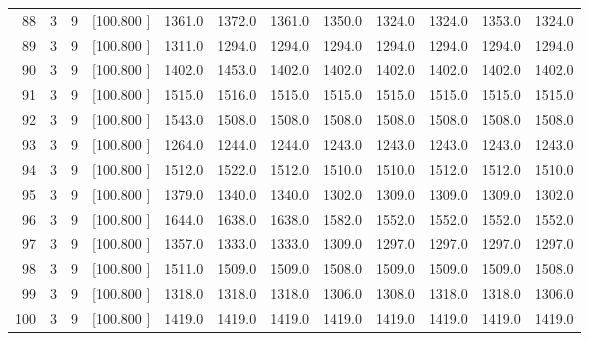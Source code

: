 \documentclass[12pt,a4paper]{article}
\begin{document}
\begin{center}
{\begin{tabular}{r r r r r r r r r r r r}
  88&  3&  9&[100.800   ]&  1361.0&  1372.0&  1361.0&  1350.0&  1324.0&  1324.0&  1353.0&  1324.0\\[-0.02in]
  89&  3&  9&[100.800   ]&  1311.0&  1294.0&  1294.0&  1294.0&  1294.0&  1294.0&  1294.0&  1294.0\\[-0.02in]
  90&  3&  9&[100.800   ]&  1402.0&  1453.0&  1402.0&  1402.0&  1402.0&  1402.0&  1402.0&  1402.0\\[-0.02in]
  91&  3&  9&[100.800   ]&  1515.0&  1516.0&  1515.0&  1515.0&  1515.0&  1515.0&  1515.0&  1515.0\\[-0.02in]
  92&  3&  9&[100.800   ]&  1543.0&  1508.0&  1508.0&  1508.0&  1508.0&  1508.0&  1508.0&  1508.0\\[-0.02in]
  93&  3&  9&[100.800   ]&  1264.0&  1244.0&  1244.0&  1243.0&  1243.0&  1243.0&  1243.0&  1243.0\\[-0.02in]
  94&  3&  9&[100.800   ]&  1512.0&  1522.0&  1512.0&  1510.0&  1510.0&  1512.0&  1512.0&  1510.0\\[-0.02in]
  95&  3&  9&[100.800   ]&  1379.0&  1340.0&  1340.0&  1302.0&  1309.0&  1309.0&  1309.0&  1302.0\\[-0.02in]
  96&  3&  9&[100.800   ]&  1644.0&  1638.0&  1638.0&  1582.0&  1552.0&  1552.0&  1552.0&  1552.0\\[-0.02in]
  97&  3&  9&[100.800   ]&  1357.0&  1333.0&  1333.0&  1309.0&  1297.0&  1297.0&  1297.0&  1297.0\\[-0.02in]
  98&  3&  9&[100.800   ]&  1511.0&  1509.0&  1509.0&  1508.0&  1509.0&  1509.0&  1509.0&  1508.0\\[-0.02in]
  99&  3&  9&[100.800   ]&  1318.0&  1318.0&  1318.0&  1306.0&  1308.0&  1318.0&  1318.0&  1306.0\\[-0.02in]
 100&  3&  9&[100.800   ]&  1419.0&  1419.0&  1419.0&  1419.0&  1419.0&  1419.0&  1419.0&  1419.0\\[-0.02in]

\hline
\end{tabular}}
\end{center}
\end{document}
